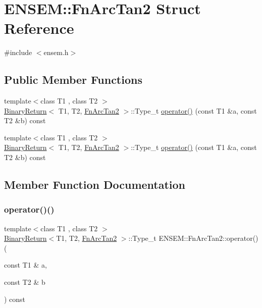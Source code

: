 \hypertarget{structENSEM_1_1FnArcTan2}{}\section{E\+N\+S\+EM\+:\+:Fn\+Arc\+Tan2 Struct Reference}
\label{structENSEM_1_1FnArcTan2}


{\ttfamily \#include $<$ensem.\+h$>$}

\subsection*{Public Member Functions}
\begin{DoxyCompactItemize}
\item 
{\footnotesize template$<$class T1 , class T2 $>$ }\\\mbox{\hyperlink{structENSEM_1_1BinaryReturn}{Binary\+Return}}$<$ T1, T2, \mbox{\hyperlink{structENSEM_1_1FnArcTan2}{Fn\+Arc\+Tan2}} $>$\+::Type\+\_\+t \mbox{\hyperlink{structENSEM_1_1FnArcTan2_a85fa496fe2e31b3576d34560143f5b8f}{operator()}} (const T1 \&a, const T2 \&b) const
\item 
{\footnotesize template$<$class T1 , class T2 $>$ }\\\mbox{\hyperlink{structENSEM_1_1BinaryReturn}{Binary\+Return}}$<$ T1, T2, \mbox{\hyperlink{structENSEM_1_1FnArcTan2}{Fn\+Arc\+Tan2}} $>$\+::Type\+\_\+t \mbox{\hyperlink{structENSEM_1_1FnArcTan2_a85fa496fe2e31b3576d34560143f5b8f}{operator()}} (const T1 \&a, const T2 \&b) const
\end{DoxyCompactItemize}


\subsection{Member Function Documentation}
\mbox{\label{structENSEM_1_1FnArcTan2_a85fa496fe2e31b3576d34560143f5b8f}} 
\subsubsection{\texorpdfstring{operator()()}{operator()()}\hspace{0.1cm}{\footnotesize\ttfamily [1/2]}}
{\footnotesize\ttfamily template$<$class T1 , class T2 $>$ \\
\mbox{\hyperlink{structENSEM_1_1BinaryReturn}{Binary\+Return}}$<$T1, T2, \mbox{\hyperlink{structENSEM_1_1FnArcTan2}{Fn\+Arc\+Tan2}} $>$\+::Type\+\_\+t E\+N\+S\+E\+M\+::\+Fn\+Arc\+Tan2\+::operator() (\begin{DoxyParamCaption}\item[{const T1 \&}]{a,  }\item[{const T2 \&}]{b }\end{DoxyParamCaption}) const\hspace{0.3cm}{\ttfamily [inline]}}

